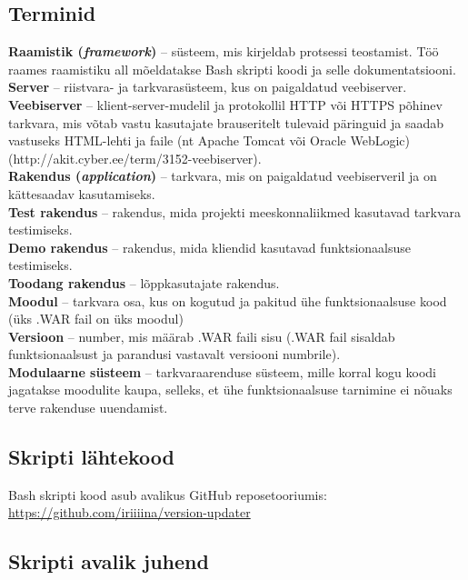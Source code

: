 \documentclass[12pt]{report}
\begin{document}
  \subsection{Terminid}
  
  \textbf{Raamistik (\textit{framework})} \--- süsteem, mis kirjeldab protsessi teostamist. Töö raames raamistiku all mõeldatakse Bash skripti koodi ja selle dokumentatsiooni.\\
  \textbf{Server} \--- riistvara- ja tarkvarasüsteem, kus on paigaldatud veebiserver.\\
  \textbf{Veebiserver} \--- klient-server-mudelil ja protokollil HTTP või HTTPS põhinev tarkvara, mis võtab vastu kasutajate brauseritelt tulevaid päringuid ja saadab vastuseks HTML-lehti ja faile (nt Apache Tomcat või Oracle WebLogic) (http://akit.cyber.ee/term/3152-veebiserver).\\
  \textbf{Rakendus (\textit{application})} \--- tarkvara, mis on paigaldatud veebiserveril ja on kättesaadav kasutamiseks.\\
  \textbf{Test rakendus} \--- rakendus, mida projekti meeskonnaliikmed kasutavad tarkvara testimiseks.\\
  \textbf{Demo rakendus} \--- rakendus, mida kliendid kasutavad funktsionaalsuse testimiseks.\\
  \textbf{Toodang rakendus} \--- lõppkasutajate rakendus.\\
  \textbf{Moodul} \--- tarkvara osa, kus on kogutud ja pakitud ühe funktsionaalsuse kood (üks .WAR fail on üks moodul)\\
  \textbf{Versioon} \--- number, mis määrab .WAR faili sisu (.WAR fail sisaldab funktsionaalsust ja parandusi vastavalt versiooni numbrile).\\
  \textbf{Modulaarne süsteem} \--- tarkvaraarenduse süsteem, mille korral kogu koodi jagatakse moodulite kaupa, selleks, et ühe funktsionaalsuse tarnimine ei nõuaks terve rakenduse uuendamist.\\
  
  \subsection{Skripti lähtekood}
  
  Bash skripti kood asub avalikus GitHub reposetooriumis: \url{https://github.com/iriiiina/version-updater}
  
  \subsection{Skripti avalik juhend}
  
\end{document}
